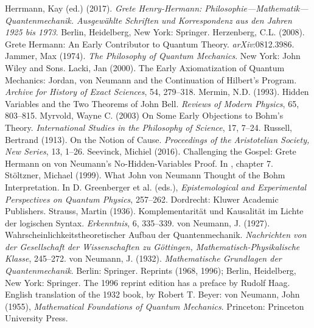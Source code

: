 \documentclass[11pt]{article}
\begin{document}
\begin{thebibliography}{99}
Herrmann, Kay (ed.) (2017). \emph{Grete Henry-Hermann: Philosophie---Mathematik---Quantenmechanik. Ausgew\"{a}hlte Schriften und Korrespondenz aus den Jahren 1925 bis 1973}.  Berlin, Heidelberg, New York: Springer.
Herzenberg, C.L. (2008). Grete Hermann: An Early Contributor to Quantum Theory. \emph{arXiv}:0812.3986.
Jammer, Max (1974). \emph{The Philosophy of Quantum Mechanics}. New York: John Wiley and Sons.
Lacki, Jan (2000). The Early Axiomatization of Quantum Mechanics: Jordan, von Neumann and the Continuation of Hilbert's Program. \emph{Archive for  History of Exact Sciences}, 54, 279--318.
Mermin, N.D. (1993). Hidden Variables and the Two Theorems of John Bell. \emph{Reviews of Modern Physics}, 65, 803--815.
Myrvold, Wayne C. (2003) On Some Early Objections to Bohm's Theory. \emph{International Studies in the Philosophy of Science}, 17, 7--24.
Russell, Bertrand (1913). On the Notion of Cause. \emph{Proceedings of the Aristotelian Society, New Series}, 13, 1--26.
Seevinck, Michiel (2016). Challenging the Gospel: Grete Hermann on von Neumann's No-Hidden-Variables Proof. In \cite{crull}, chapter 7.
St\"{o}ltzner, Michael (1999). What John von Neumann Thought of the Bohm Interpretation. In D. Greenberger et al. (eds.), \emph{Epistemological and Experimental Perspectives on Quantum Physics}, 257--262. Dordrecht: Kluwer Academic Publishers.
Strauss, Martin (1936). Komplementarit\"{a}t und Kausalit\"{a}t im Lichte der logischen Syntax. \emph{Erkenntnis}, 6, 335--339.
von Neumann, J. (1927). Wahrscheinlichkeitstheoretischer Aufbau der Quantenmechanik. \emph{Nachrichten von der Gesellschaft der Wissenschaften zu G\"{o}ttingen, Mathematisch-Physikalische Klasse}, 245--272.
von Neumann, J. (1932). \emph{Mathematische Grundlagen der Quantenmechanik}. Berlin: Springer. Reprints (1968, 1996); Berlin, Heidelberg, New York: Springer. The 1996 reprint edition has a preface by Rudolf Haag.  English translation of the 1932 book, by Robert T. Beyer: von Neumann, John (1955), \emph{Mathematical Foundations of Quantum Mechanics}. Princeton: Princeton University Press.


\end{thebibliography}
\end{document}

